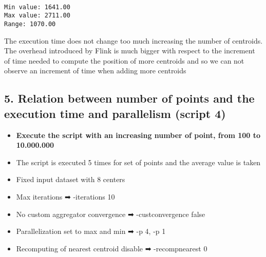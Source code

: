 \documentclass[11pt]{article}
\providecommand{\tightlist}{%
      \setlength{\itemsep}{0pt}\setlength{\parskip}{0pt}}
\begin{document}
    \begin{center}
    \end{center}
    { \hspace*{\fill} \\}
    
    \begin{Verbatim}[commandchars=\\\{\}]
Min value: 1641.00
Max value: 2711.00
Range: 1070.00

    \end{Verbatim}

    The execution time does not change too much increasing the number of
centroids. The overhead introduced by Flink is much bigger with respect
to the increment of time needed to compute the position of more
centroids and so we can not observe an increment of time when adding
more centroids

    \hypertarget{relation-between-number-of-points-and-the-execution-time-and-parallelism-script-4}{%
\subsection{5. Relation between number of points and the execution time
and parallelism (script
4)}\label{relation-between-number-of-points-and-the-execution-time-and-parallelism-script-4}}

\begin{itemize}
\tightlist
\item
  \textbf{Execute the script with an increasing number of point, from
  100 to 10.000.000}
\item
  The script is executed 5 times for set of points and the average value
  is taken
\item
  Fixed input dataset with 8 centers
\item
  Max iterations ➡ -iterations 10
\item
  No custom aggregator convergence ➡ -custconvergence false
\item
  Parallelization set to max and min ➡ -p 4, -p 1
\item
  Recomputing of nearest centroid disable ➡ -recompnearest 0
\end{itemize}
\end{document}
